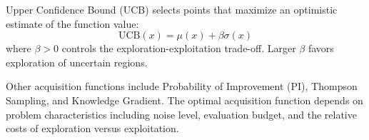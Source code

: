 \begin{definition}
\label{def:ucb}
Upper Confidence Bound (UCB) selects points that maximize an optimistic estimate of the function value:
\begin{equation}
\text{UCB}(x) = \mu(x) + \beta \sigma(x)
\end{equation}
where $\beta > 0$ controls the exploration-exploitation trade-off. Larger $\beta$ favors exploration of uncertain regions.
\end{definition}

Other acquisition functions include Probability of Improvement (PI), Thompson Sampling, and Knowledge Gradient. The optimal acquisition function depends on problem characteristics including noise level, evaluation budget, and the relative costs of exploration versus exploitation.

